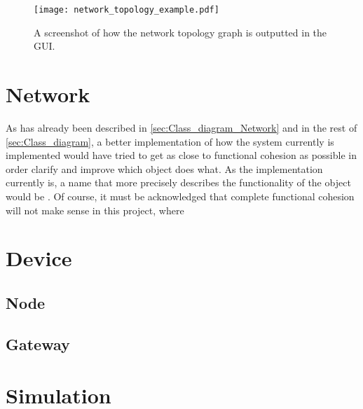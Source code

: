 \begin{figure}[H]
  \centering
  \texttt{[image: network\_topology\_example.pdf]}
  \caption{A screenshot of how the network topology graph is outputted in the GUI.}
  \label{fig:network_topology_example}
\end{figure}




\section{Network}
As has already been described in \autoref{sec:Class_diagram_Network} and in the rest of \autoref{sec:Class_diagram}, a better implementation of how the system currently is implemented would have tried to get as close to functional cohesion as possible in order clarify and improve which object does what. As the implementation currently is, a name that more precisely describes the functionality of the  object would be . Of course, it must be acknowledged that complete functional cohesion will not make sense in this project, where


\section{Device}


\subsection{Node}


\subsection{Gateway}


\section{Simulation}



































